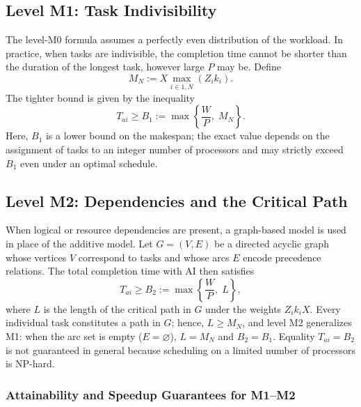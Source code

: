 \subsection{Level M1: Task Indivisibility}

\begin{remark}\label{rem:indivisible}
The level-M0 formula assumes a perfectly even distribution of the workload. In practice, when tasks are indivisible, the completion time cannot be shorter than the duration of the longest task, however large $P$ may be. Define
\[
  M_N := X \max_{i \in \overline{1,N}} (Z_i k_i).
\]
The tighter bound is given by the inequality
\[
  T_{ai} \ge B_1 := \max\left\{ \frac{W}{P},\; M_N \right\}.
\]
Here, $B_1$ is a lower bound on the makespan; the exact value depends on the assignment of tasks to an integer number of processors and may strictly exceed $B_1$ even under an optimal schedule.
\end{remark}

\subsection{Level M2: Dependencies and the Critical Path}

\begin{remark}\label{rem:graph}
When logical or resource dependencies are present, a graph-based model is used in place of the additive model. Let $G = (V, E)$ be a directed acyclic graph whose vertices $V$ correspond to tasks and whose arcs $E$ encode precedence relations. The total completion time with AI then satisfies
\[
  T_{ai} \ge B_2 := \max\left\{ \frac{W}{P},\; L \right\},
\]
where $L$ is the length of the critical path in $G$ under the weights $Z_i k_i X$. Every individual task constitutes a path in $G$; hence, $L \ge M_N$, and level M2 generalizes M1: when the arc set is empty ($E = \varnothing$), $L = M_N$ and $B_2 = B_1$. Equality $T_{ai} = B_2$ is not guaranteed in general because scheduling on a limited number of processors is NP-hard.
\end{remark}

\subsubsection{Attainability and Speedup Guarantees for M1--M2}

